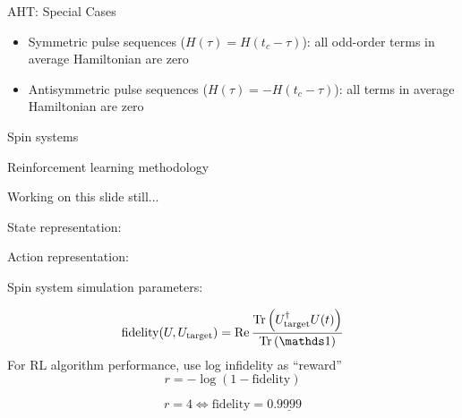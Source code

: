 \documentclass{beamer}
\begin{document}
\begin{frame}{AHT: Special Cases}

\begin{itemize}

\item
  Symmetric pulse sequences (\(H(\tau) = H(t_c - \tau)\)): all odd-order
  terms in average Hamiltonian are zero
\item
  Antisymmetric pulse sequences (\(H(\tau) = - H(t_c - \tau)\)): all
  terms in average Hamiltonian are zero
\end{itemize}
\end{frame}

\begin{frame}{Spin systems}


\end{frame}

\begin{frame}{Reinforcement learning methodology}


Working on this slide still...

State representation:

Action representation:

Spin system simulation parameters:


\[
    \text{fidelity}(U, U_\text{target}) = \Re{
        \frac{\Tr{U_\text{target}^\dagger U(t)}}{\Tr{\identity}}
    }
\]
For RL algorithm performance, use log infidelity as ``reward''
\[
    r = -\log \left( 1 - \text{fidelity} \right)
\]

\[
r = 4 \iff \text{fidelity} = 0.\underline{9999}
\]


\end{frame}
\end{document}
